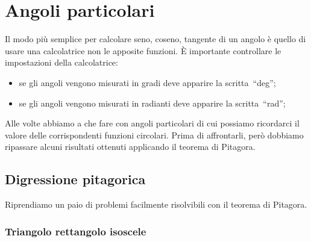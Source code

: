 \section{Angoli particolari}
\label{sec:gonio_angoli_particolari}

Il modo più semplice per calcolare seno, coseno, tangente di un angolo è 
quello 
di usare una calcolatrice non le apposite funzioni. 
È importante controllare le impostazioni della calcolatrice:
\begin{itemize} [noitemsep]
 \item se gli angoli vengono misurati in gradi deve apparire la 
 scritta~``deg'';
 \item se gli angoli vengono misurati in radianti deve apparire la 
 scritta~``rad'';
\end{itemize}

Alle volte abbiamo a che fare con angoli particolari di cui possiamo 
ricordarci 
il valore delle corrispondenti funzioni circolari. 
Prima di affrontarli, però dobbiamo ripassare alcuni risultati ottenuti 
applicando il teorema di Pitagora.


\subsection{Digressione pitagorica}

Riprendiamo un paio di problemi facilmente risolvibili con il teorema di 
Pitagora.

\subsubsection{Triangolo rettangolo isoscele}

